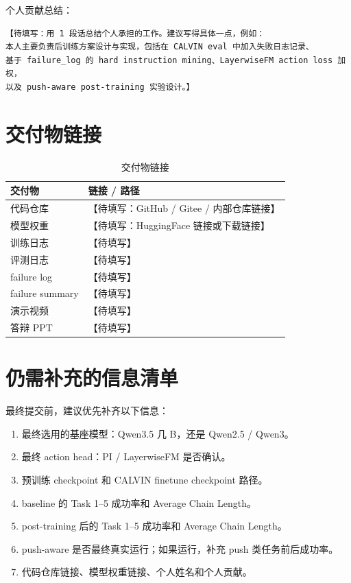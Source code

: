 \documentclass[10pt,a4paper,fontset=none]{ctexart}
\newcommand{\todo}[1]{\textcolor{TodoRed}{【#1】}}
\newcommand{\RepoLink}{\todo{待填写：GitHub / Gitee / 内部仓库链接}}
\newcommand{\WeightLink}{\todo{待填写：HuggingFace 链接或下载链接}}
\newcommand{\TrainLogLink}{\todo{待填写}}
\newcommand{\EvalLogLink}{\todo{待填写}}
\newcommand{\FailureLogLink}{\todo{待填写}}
\newcommand{\FailureSummaryLink}{\todo{待填写}}
\newcommand{\DemoVideoLink}{\todo{待填写}}
\newcommand{\PPTLink}{\todo{待填写}}
\begin{document}
个人贡献总结：

\begin{lstlisting}
【待填写：用 1 段话总结个人承担的工作。建议写得具体一点，例如：
本人主要负责后训练方案设计与实现，包括在 CALVIN eval 中加入失败日志记录、
基于 failure_log 的 hard instruction mining、LayerwiseFM action loss 加权，
以及 push-aware post-training 实验设计。】
\end{lstlisting}

\section{交付物链接}

\begin{table}[H]
\centering
\caption{交付物链接}
\begin{tabularx}{0.9\textwidth}{lX}
\toprule
交付物 & 链接 / 路径 \\
\midrule
代码仓库 & \RepoLink{} \\
模型权重 & \WeightLink{} \\
训练日志 & \TrainLogLink{} \\
评测日志 & \EvalLogLink{} \\
failure log & \FailureLogLink{} \\
failure summary & \FailureSummaryLink{} \\
演示视频 & \DemoVideoLink{} \\
答辩 PPT & \PPTLink{} \\
\bottomrule
\end{tabularx}
\end{table}

\appendix
\section{仍需补充的信息清单}

最终提交前，建议优先补齐以下信息：

\begin{enumerate}
  \item 最终选用的基座模型：Qwen3.5 几 B，还是 Qwen2.5 / Qwen3。
  \item 最终 action head：PI / LayerwiseFM 是否确认。
  \item 预训练 checkpoint 和 CALVIN finetune checkpoint 路径。
  \item baseline 的 Task 1--5 成功率和 Average Chain Length。
  \item post-training 后的 Task 1--5 成功率和 Average Chain Length。
  \item push-aware 是否最终真实运行；如果运行，补充 push 类任务前后成功率。
  \item 代码仓库链接、模型权重链接、个人姓名和个人贡献。
\end{enumerate}
\end{document}

